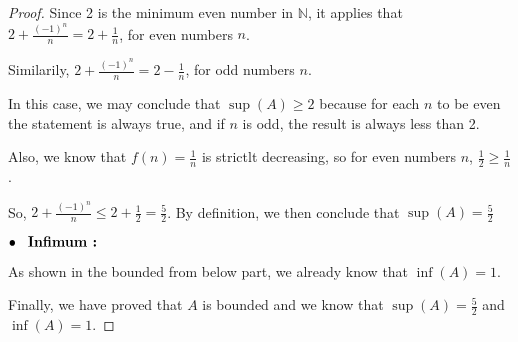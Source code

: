 \documentclass[12pt]{article}
\begin{document}
\begin{proof}
    \vspace*{0.3cm}
    Since 2 is the minimum even  number in $\mathbb{N}$,
    it applies that $2+\displaystyle\frac{(-1)^n}{n} 
    = 2+\displaystyle\frac{1}{n}$, for even numbers $n$.

    \vspace*{0.3cm}
    Similarily, $2+\displaystyle\frac{(-1)^n}{n} = 2-
    \displaystyle \frac{1}{n}$, for odd numbers $n$.

    \vspace*{0.3cm}
    In this case, we may conclude that $\sup(A)\geq2$ because
    for each $n$ to be even the statement is always true, 
    and if $n$ is odd, the result is always less than 2.

    \vspace*{0.3cm}
    Also, we know that $f(n) = \displaystyle \frac{1}{n}$ is
    strictlt decreasing, so for even numbers $n$,
    $\displaystyle \frac{1}{2} \geq \displaystyle 
    \frac{1}{n}$.

    \vspace*{0.3cm}
    So, $2 + \displaystyle\frac{(-1)^n}{n} \leq
    \displaystyle 2+\frac{1}{2} = \displaystyle 
    \frac{5}{2}$. By definition, we then conclude that
    $\sup(A) = \displaystyle\frac{5}{2}$

    \vspace*{0.3cm}
    $\bullet \hspace*{0.3cm} \textbf{Infimum :}$

    As shown in the bounded from below part, we already know that
    $\inf(A) = 1$.


    \vspace*{0.2cm}
    Finally, we have proved that $A$ is bounded and we
    know that $\sup(A) = \displaystyle \frac{5}{2}$
    and $\inf(A) = 1$.

\end{proof}
\end{document}
